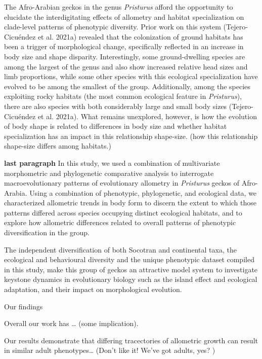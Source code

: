 \documentclass[
]{article}
\begin{document}
The Afro-Arabian geckos in the genus \emph{Pristurus} afford the
opportunity to elucidate the interdigitating effects of allometry and
habitat specialization on clade-level patterns of phenotypic diversity.
Prior work on this system (Tejero-Cicuéndez et al. 2021a) revealed that
the colonization of ground habitats has been a trigger of morphological
change, specifically reflected in an increase in body size and shape
disparity. Interestingly, some ground-dwelling species are among the
largest of the genus and also show increased relative head sizes and
limb proportions, while some other species with this ecological
specialization have evolved to be among the smallest of the group.
Additionally, among the species exploiting rocky habitats (the most
common ecological feature in \emph{Pristurus}), there are also species
with both considerably large and small body sizes (Tejero-Cicuéndez et
al. 2021a). What remains unexplored, however, is how the evolution of
body shape is related to differences in body size and whether habitat
specialization has an impact in this relationship shape-size. (how this
relationship shape-size differs among habitats.) \hfill\break

\textbf{last paragraph} In this study, we used a combination of
multivariate morphometric and phylogenetic comparative analysis to
interrogate macroevolutionary patterns of evolutionary allometry in
\emph{Pristurus} geckos of Afro-Arabia. Using a combination of
phenotypic, phylogenetic, and ecological data, we characterized
allometric trends in body form to discern the extent to which those
patterns differed across species occupying distinct ecological habitats,
and to explore how allometric differences related to overall patterns of
phenotypic diversification in the group.

The independent diversification of both Socotran and continental taxa,
the ecological and behavioural diversity and the unique phenotypic
dataset compiled in this study, make this group of geckos an attractive
model system to investigate keystone dynamics in evolutionary biology
such as the island effect and ecological adaptation, and their impact on
morphological evolution.

Our findings

Overall our work has \ldots{} (some implication).

Our results demonstrate that differing tracectories of allometric growth
can result in similar adult phenotypes\ldots{} (Don't like it! We've got
adults, yes? )
\end{document}
